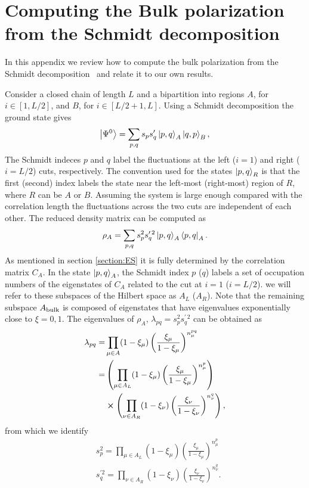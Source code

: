 \documentclass[twocolumn,amsmath,longbibliography,amssymb,superscriptaddress]{revtex4-1}
\begin{document}
	

	
\appendix


\section{Computing the Bulk polarization from the Schmidt decomposition}\label{app:pollmann}

In this appendix we review  how to compute the bulk polarization from the Schmidt decomposition~\cite{Zaletel2014} and relate it to our own results.

Consider a closed chain of length $L$ and a bipartition into regions $A$, for $i\in [1,L/2]$, and $B$, for $i \in [L/2+1,L]$. Using a Schmidt decomposition the ground state gives
\begin{equation}
\ket{\Psi^0} = \sum_{p,q} s_p s'_q \ket{p,q}_A \ket{q,p}_B,
\end{equation}
The Schmidt indeces $p$ and $q$ label the fluctuations at the left ($i=1$) and right ($i=L/2$) cuts, respectively. The convention used for the states $\ket{p,q}_{R}$ is that the first (second) index labels the state near the left-most (right-most) region of $R$, where $R$ can be $A$ or $B$. Assuming the system is large enough compared with the correlation length the fluctuations across the two cuts are independent of each other. The reduced density matrix can be computed as
\begin{equation}
\rho_A = \sum_{p,q} s_p^2 s^{\prime \, 2}_q \ket{p,q}_{A}\bra{p,q}_A .
\end{equation}
As mentioned in section \ref{section:ES} it is fully determined by the correlation matrix $C_A$. In the state $\ket{p,q}_A$, the Schmidt index $p$ ($q$) labels a set of occupation numbers of the eigenstates of $C_A$ related to the cut at $i=1$ ($i=L/2$). we will refer to these subspaces of the Hilbert space as $A_L$ ($A_R$). Note that the remaining subspace $A_{\rm bulk}$ is composed of eigenstates that have eigenvalues exponentially close to $\xi = 0,1$. The eigenvalues of $\rho_A$, $\lambda_{pq}=s_p^2 s_q^{\prime \, 2}$ can be obtained as \cite{Alexandrinata2011}
\begin{align}
\lambda_{pq} =& \prod_{\mu \in A} (1-\xi_\mu)\left(\frac{\xi_\mu}{1-\xi_\mu}\right)^{n_\mu^{pq}} \\
=&\left(\prod_{\mu\in A_L} (1-\xi_\mu)\left(\frac{\xi_\mu}{1-\xi_\mu}\right)^{n_\mu^{p}} \right) \\
&\cross \left(\prod_{\nu \in A_R} (1-\xi_\nu)\left(\frac{\xi_\nu}{1-\xi_\nu}\right)^{n_\nu^{q}} \right) ,
\label{eq:Alexandrinata}
\end{align}
from which we identify 
\begin{align*}
&s_p^2 = \prod_{\mu\in A_L} (1-\xi_\mu)\left(\frac{\xi_\mu}{1-\xi_\mu}\right)^{n_\mu^{p}} \\
&s_q^{\prime 2} = \prod_{\nu \in A_R} (1-\xi_\nu)\left(\frac{\xi_\nu}{1-\xi_\nu}\right)^{n_\nu^{q}}.
\label{eq:spsq_A}
\end{align*}
\end{document}
